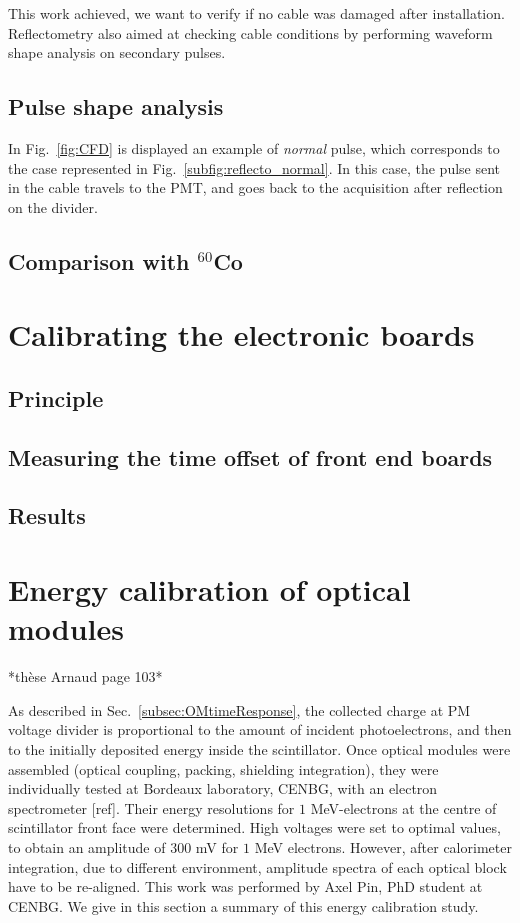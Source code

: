 This work achieved, we want to verify if no cable was damaged after installation.
Reflectometry also aimed at checking cable conditions by performing waveform shape analysis on secondary pulses.

\subsection{Pulse shape analysis}
\label{subsec:pulse_shape}
In Fig.~\ref{fig:CFD} is displayed an example of \emph{normal} pulse, which corresponds to the case represented in Fig.~\ref{subfig:reflecto_normal}.
In this case, the pulse sent in the cable travels to the PMT, and goes back to the acquisition after reflection on the divider.


\subsection{Comparison with $^{60}$Co}



\section{Calibrating the electronic boards}
\label{sec:TimeSynchroFEB}

\subsection{Principle}
\subsection{Measuring the time offset of front end boards}
\subsection{Results}


\section{Energy calibration of optical modules}
\label{sec:comm_energy_calibration}


*thèse Arnaud page 103*

As described in Sec.~\ref{subsec:OMtimeResponse}, the collected charge at PM voltage divider is proportional to the amount of incident photoelectrons, and then to the initially deposited energy inside the scintillator.
Once optical modules were assembled (optical coupling, packing, shielding integration), they were individually tested at Bordeaux laboratory, CENBG, with an electron spectrometer [ref].
Their energy resolutions for $1$ MeV-electrons at the centre of scintillator front face were determined.
High voltages were set to optimal values, to obtain an amplitude of $300$ mV for $1$ MeV electrons.
However, after calorimeter integration, due to different environment, amplitude spectra of each optical block have to be re-aligned.
This work was performed by Axel Pin, PhD student at CENBG.
We give in this section a summary of this energy calibration study.

